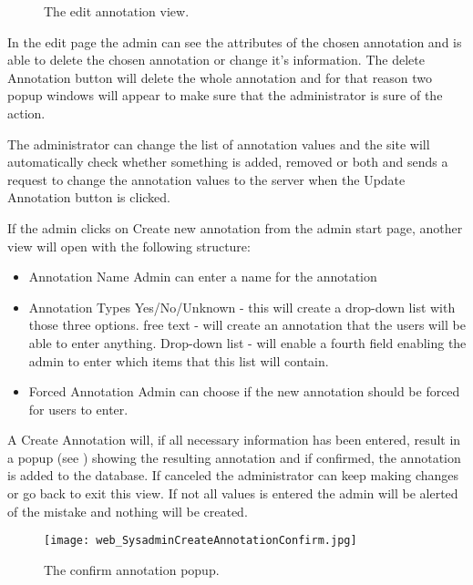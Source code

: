\begin{figure}[h]
 \caption{The edit annotation view.}
 \label{adm_web_editView}
\end{figure}
In the edit page the admin can see the attributes of the chosen annotation and is able to delete the chosen annotation or change it's information.
The delete Annotation button will delete the whole annotation and for that reason two popup windows will appear to make sure that the administrator is sure of the action.

The administrator can change the list of annotation values and the site will automatically check whether 
something is added, removed or both and sends a request to change the annotation values to the server when the Update Annotation button is clicked.

If the admin clicks on Create new annotation from the admin start page, another view will open with the following structure:
\begin{itemize}
 \item Annotation Name
 \subitem Admin can enter a name for the annotation
 
 \item Annotation Types
 \subitem Yes/No/Unknown - this will create a drop-down list with those three options.
 \subitem free text - will create an annotation that the users will be able to enter anything.
 \subitem Drop-down list - will enable a fourth field enabling the admin to enter which items that this list will contain.
 
 \item Forced Annotation
 \subitem Admin can choose if the new annotation should be forced for users to enter. 
\end{itemize}

A Create Annotation will, if all necessary information has been entered, result in a popup (see ) showing the resulting annotation and if confirmed, the annotation is added to the database. 
If canceled the administrator can keep making changes or go back to exit this view. If not all values is entered the admin will be alerted of the mistake and nothing will be created.

\begin{figure}[h]
 \centering
 \texttt{[image: web\_SysadminCreateAnnotationConfirm.jpg]}
 \caption{The confirm annotation popup.}
 \label{adm_web_createPopup}
\end{figure}



